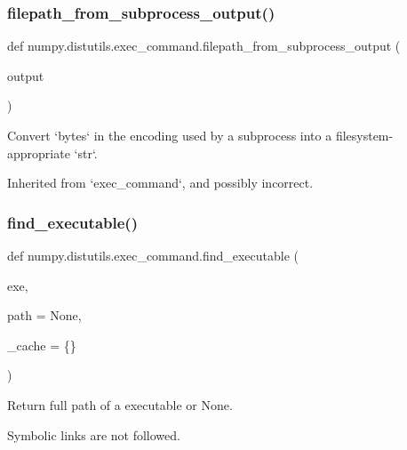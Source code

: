 \subsubsection{\texorpdfstring{filepath\+\_\+from\+\_\+subprocess\+\_\+output()}{filepath\_from\_subprocess\_output()}}
{\footnotesize\ttfamily def numpy.\+distutils.\+exec\+\_\+command.\+filepath\+\_\+from\+\_\+subprocess\+\_\+output (\begin{DoxyParamCaption}\item[{}]{output }\end{DoxyParamCaption})}

\begin{DoxyVerb}Convert `bytes` in the encoding used by a subprocess into a filesystem-appropriate `str`.

Inherited from `exec_command`, and possibly incorrect.
\end{DoxyVerb}
 \mbox{\label{namespacenumpy_1_1distutils_1_1exec__command_a9ad5db20f4885acfc4b50e57c0408732}} 
\subsubsection{\texorpdfstring{find\+\_\+executable()}{find\_executable()}}
{\footnotesize\ttfamily def numpy.\+distutils.\+exec\+\_\+command.\+find\+\_\+executable (\begin{DoxyParamCaption}\item[{}]{exe,  }\item[{}]{path = {\ttfamily None},  }\item[{}]{\+\_\+cache = {\ttfamily \{\}} }\end{DoxyParamCaption})}

\begin{DoxyVerb}Return full path of a executable or None.

Symbolic links are not followed.
\end{DoxyVerb}
 \mbox{\label{namespacenumpy_1_1distutils_1_1exec__command_a3cd3421a69e8e2884723e8334e866a0e}} 

